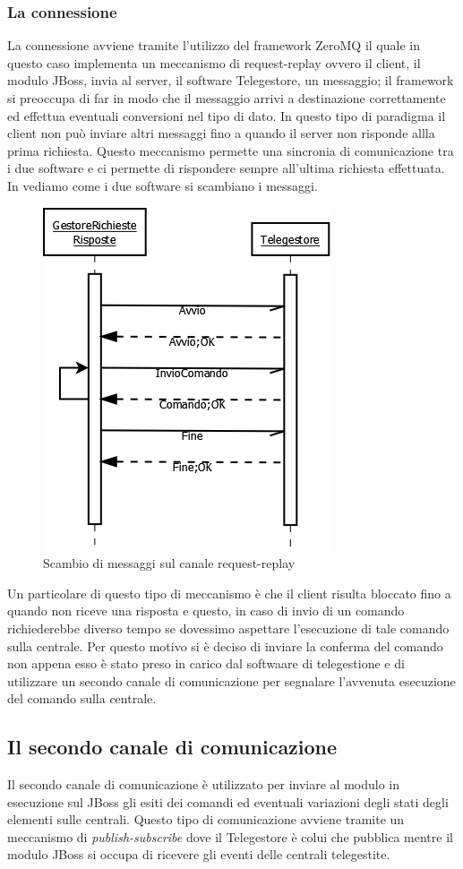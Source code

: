 \subsubsection{La connessione}
La connessione avviene tramite l'utilizzo del framework ZeroMQ\cite{zmq} il quale in questo caso implementa un meccanismo di request-replay ovvero il client, il modulo JBoss, invia al server, il software Telegestore, un messaggio; il framework si preoccupa di far in modo che il messaggio arrivi a destinazione correttamente ed effettua eventuali conversioni nel tipo di dato. In questo tipo di paradigma il client non può inviare altri messaggi fino a quando il server non risponde allla prima richiesta. Questo meccanismo permette una sincronia di comunicazione tra i due software e ci permette di rispondere sempre all'ultima richiesta effettuata. In  vediamo come i due software si scambiano i messaggi.
\begin{figure}
	\centering
	\includegraphics[width=0.5\linewidth]{pictures/congesttele.png}
	\caption{Scambio di messaggi sul canale request-replay}\label{fig:contteljboss}
\end{figure}
Un particolare di questo tipo di meccanismo è che il client risulta bloccato fino a quando non riceve una risposta e questo, in caso di invio di un comando richiederebbe diverso tempo se dovessimo aspettare l'esecuzione di tale comando sulla centrale. Per questo motivo si è deciso di inviare la conferma del comando non appena esso è stato preso in carico dal softwaare di telegestione e di utilizzare un secondo canale di comunicazione per segnalare l'avvenuta esecuzione del comando sulla centrale.
\subsection{Il secondo canale di comunicazione}
Il secondo canale di comunicazione è utilizzato per inviare al modulo in esecuzione sul JBoss gli esiti dei comandi ed eventuali variazioni degli stati degli elementi sulle centrali. Questo tipo di comunicazione avviene tramite un meccanismo di \emph{publish-subscribe} dove il Telegestore è colui che pubblica mentre il modulo JBoss si occupa di ricevere gli eventi delle centrali telegestite.
